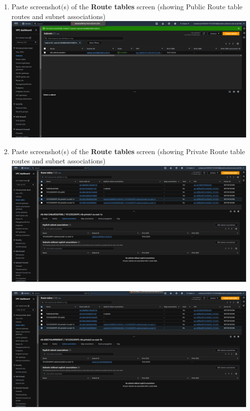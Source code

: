 \documentclass[11pt]{article}
\begin{document}
\begin{enumerate}
    \item Paste screenshot$($s$)$ of the \textbf{Route tables} screen (showing Public Route table routes and subnet associations) \\

    {\centering
    \includegraphics[width=5.8in]{pics/8.png}
    }

    \item Paste screenshot$($s$)$ of the \textbf{Route tables} screen (showing Private Route table routes and subnet associations) \\

    {\centering
    \includegraphics[width=5.8in]{pics/9a.png}
    }

    {\centering
    \includegraphics[width=5.8in]{pics/9b.png}
    }


\end{enumerate}
\end{document}
